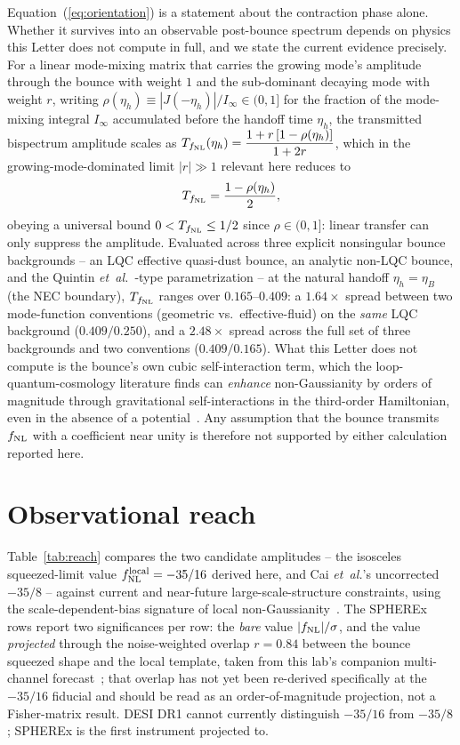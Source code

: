 \documentclass[aps,prd,reprint,superscriptaddress,showpacs,preprintnumbers,nofootinbib,longbibliography,floatfix]{revtex4-2}
\newcommand{\fnl}{f_{\rm NL}}
\newcommand{\etal}{\textit{et~al.}}
\begin{document}
Equation~(\ref{eq:orientation}) is a statement about the contraction phase alone. Whether
it survives into an observable post-bounce spectrum depends on physics this Letter does
not compute in full, and we state the current evidence precisely. For a linear
mode-mixing matrix that carries the growing mode's amplitude through the bounce with
weight $1$ and the sub-dominant decaying mode with weight $r$, writing $\rho(\eta_h)\equiv
|J(-\eta_h)|/I_\infty\in(0,1]$ for the fraction of the mode-mixing integral $I_\infty$
accumulated before the handoff time $\eta_h$, the transmitted bispectrum amplitude scales
as $T_{\fnl}(\eta_h)=\dfrac{1+r\,[1-\rho(\eta_h)]}{1+2r}$, which in the growing-mode-dominated
limit $|r|\gg1$ relevant here reduces to
\begin{equation}
T_{\fnl}=\frac{1-\rho(\eta_h)}{2},
\end{equation}
obeying a universal bound $0<T_{\fnl}\le1/2$ since $\rho\in(0,1]$: linear transfer can
only suppress the amplitude. Evaluated across three explicit nonsingular bounce
backgrounds -- an LQC effective quasi-dust bounce, an analytic non-LQC bounce, and the
Quintin \etal~\cite{Quintin:2015}-type parametrization -- at the natural handoff
$\eta_h=\eta_B$ (the NEC boundary), $T_{\fnl}$ ranges over $0.165$--$0.409$: a
$1.64\times$ spread between two mode-function conventions (geometric vs.\ effective-fluid)
on the \emph{same} LQC background ($0.409/0.250$), and a $2.48\times$ spread across the
full set of three backgrounds and two conventions ($0.409/0.165$). What this Letter does
not compute is the bounce's own cubic self-interaction term, which the
loop-quantum-cosmology literature finds can \emph{enhance} non-Gaussianity by orders of
magnitude through gravitational self-interactions in the third-order Hamiltonian, even in
the absence of a potential~\cite{AgulloBollietSreenath:2017}. Any assumption that the
bounce transmits $\fnl$ with a coefficient near unity is therefore not supported by
either calculation reported here.

\section{Observational reach}

Table~\ref{tab:reach} compares the two candidate amplitudes -- the isosceles
squeezed-limit value $f_{\rm NL}^{\rm local}=-35/16$ derived here, and Cai \etal's
uncorrected $-35/8$ -- against current and near-future large-scale-structure constraints,
using the scale-dependent-bias signature of local non-Gaussianity~\cite{Dalal:2007cu}.
The SPHEREx rows report two significances per row: the \emph{bare} value
$|f_{\rm NL}|/\sigma$, and the value \emph{projected} through the noise-weighted overlap
$r=0.84$ between the bounce squeezed shape and the local template, taken from this lab's
companion multi-channel forecast~\cite{Golden2026Multichannel}; that overlap has not yet
been re-derived specifically at the $-35/16$ fiducial and should be read as an
order-of-magnitude projection, not a Fisher-matrix result. DESI DR1 cannot currently
distinguish $-35/16$ from $-35/8$; SPHEREx is the first instrument projected to.
\end{document}
